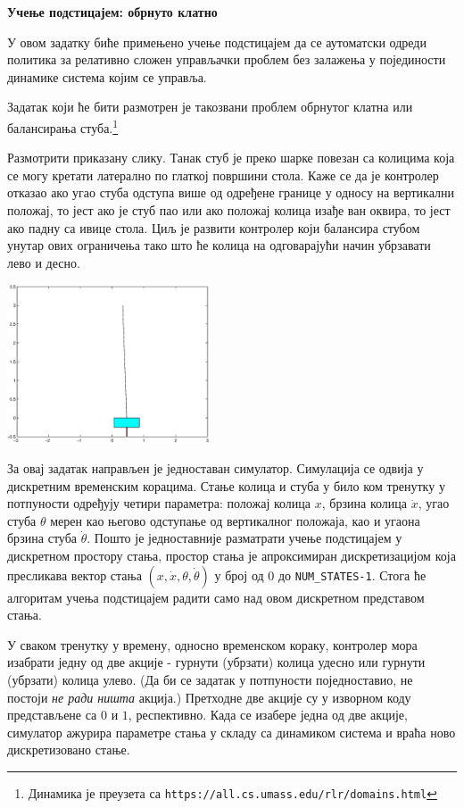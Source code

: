 
\item {} {\bf Учење подстицајем: обрнуто клатно}

У овом задатку биће примењено учење подстицајем да се аутоматски одреди политика за релативно сложен управљачки проблем без залажења у појединости динамике система којим се управља.

Задатак који ће бити размотрен је такозвани проблем обрнутог клатна или балансирања стуба.\footnote{Динамика је преузета са {\tt https://all.cs.umass.edu/rlr/domains.html}}

Размотрити приказану слику. Танак стуб је преко шарке повезан са колицима која се могу кретати латерално по глаткој површини стола. Каже се да је контролер отказао ако угао стуба одступа више од одређене границе у односу на вертикални положај, то јест ако је стуб пао или ако положај колица изађе ван оквира, то јест ако падну са ивице стола. Циљ је развити контролер који балансира стубом унутар ових ограничења тако што ће колица на одговарајући начин убрзавати лево и десно.

\begin{center}
 \includegraphics[width=6cm]{cartpole/cart_pole.eps}
\end{center}

За овај задатак направљен је једноставан симулатор. Симулација се одвија у дискретним временским корацима. Стање колица и стуба у било ком тренутку у потпуности одређују четири параметра: положај колица $x$, брзина колица $\dot{x}$, угао стуба $\theta$ мерен као његово одступање од вертикалног положаја, као и угаона брзина стуба $\dot{\theta}$. Пошто је једноставније разматрати учење подстицајем у дискретном простору стања, простор стања је апроксимиран дискретизацијом која пресликава вектор стања $(x,\dot{x}, \theta, \dot{\theta})$ у број од 0 до {\tt NUM\_STATES-1}. Стога ће алгоритам учења подстицајем радити само над овом дискретном представом стања.

У сваком тренутку у времену, односно временском кораку, контролер мора изабрати једну од две акције - гурнути (убрзати) колица удесно или гурнути (убрзати) колица улево. (Да би се задатак у потпуности поједноставио, не постоји {\it не ради ништа} акција.) Претходне две акције су у изворном коду представљене са $0$ и $1$, респективно. Када се изабере једна од две акције, симулатор ажурира параметре стања у складу са динамиком система и враћа ново дискретизовано стање.

